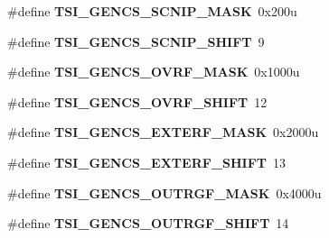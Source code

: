 \begin{DoxyCompactItemize}
\item 
\hypertarget{group___t_s_i___register___masks_gaf7212a89bc45902f2ed4cee12a1ceb92}{}\#define {\bfseries T\+S\+I\+\_\+\+G\+E\+N\+C\+S\+\_\+\+S\+C\+N\+I\+P\+\_\+\+M\+A\+S\+K}~0x200u\label{group___t_s_i___register___masks_gaf7212a89bc45902f2ed4cee12a1ceb92}

\item 
\hypertarget{group___t_s_i___register___masks_ga372b92d46c9f071d4fdee3edcc0d5219}{}\#define {\bfseries T\+S\+I\+\_\+\+G\+E\+N\+C\+S\+\_\+\+S\+C\+N\+I\+P\+\_\+\+S\+H\+I\+F\+T}~9\label{group___t_s_i___register___masks_ga372b92d46c9f071d4fdee3edcc0d5219}

\item 
\hypertarget{group___t_s_i___register___masks_ga9d9ee2965d913e5b2eb7a9a71a5c26e8}{}\#define {\bfseries T\+S\+I\+\_\+\+G\+E\+N\+C\+S\+\_\+\+O\+V\+R\+F\+\_\+\+M\+A\+S\+K}~0x1000u\label{group___t_s_i___register___masks_ga9d9ee2965d913e5b2eb7a9a71a5c26e8}

\item 
\hypertarget{group___t_s_i___register___masks_ga36164d96be108b8f9e9c9ba32db4363c}{}\#define {\bfseries T\+S\+I\+\_\+\+G\+E\+N\+C\+S\+\_\+\+O\+V\+R\+F\+\_\+\+S\+H\+I\+F\+T}~12\label{group___t_s_i___register___masks_ga36164d96be108b8f9e9c9ba32db4363c}

\item 
\hypertarget{group___t_s_i___register___masks_ga33e3d274099483b6ebf7897b7d72b866}{}\#define {\bfseries T\+S\+I\+\_\+\+G\+E\+N\+C\+S\+\_\+\+E\+X\+T\+E\+R\+F\+\_\+\+M\+A\+S\+K}~0x2000u\label{group___t_s_i___register___masks_ga33e3d274099483b6ebf7897b7d72b866}

\item 
\hypertarget{group___t_s_i___register___masks_ga90ccee35b83ef31a092ad15e533e6396}{}\#define {\bfseries T\+S\+I\+\_\+\+G\+E\+N\+C\+S\+\_\+\+E\+X\+T\+E\+R\+F\+\_\+\+S\+H\+I\+F\+T}~13\label{group___t_s_i___register___masks_ga90ccee35b83ef31a092ad15e533e6396}

\item 
\hypertarget{group___t_s_i___register___masks_gae0670e2e8c0eb55717171acb5a2bebfe}{}\#define {\bfseries T\+S\+I\+\_\+\+G\+E\+N\+C\+S\+\_\+\+O\+U\+T\+R\+G\+F\+\_\+\+M\+A\+S\+K}~0x4000u\label{group___t_s_i___register___masks_gae0670e2e8c0eb55717171acb5a2bebfe}

\item 
\hypertarget{group___t_s_i___register___masks_gaa269027bdefea51eddd47bfc47140224}{}\#define {\bfseries T\+S\+I\+\_\+\+G\+E\+N\+C\+S\+\_\+\+O\+U\+T\+R\+G\+F\+\_\+\+S\+H\+I\+F\+T}~14\label{group___t_s_i___register___masks_gaa269027bdefea51eddd47bfc47140224}


\end{DoxyCompactItemize}
